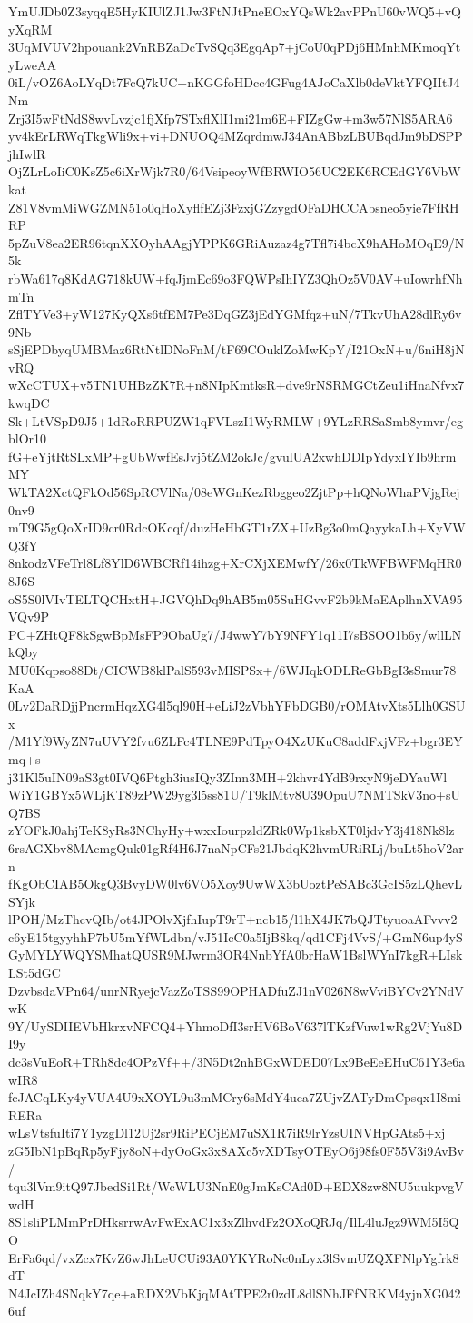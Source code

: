 YmUJDb0Z3syqqE5HyKIUlZJ1Jw3FtNJtPneEOxYQsWk2avPPnU60vWQ5+vQyXqRM
3UqMVUV2hpouank2VnRBZaDcTvSQq3EgqAp7+jCoU0qPDj6HMnhMKmoqYtyLweAA
0iL/vOZ6AoLYqDt7FcQ7kUC+nKGGfoHDcc4GFug4AJoCaXlb0deVktYFQIItJ4Nm
Zrj3I5wFtNdS8wvLvzjc1fjXfp7STxflXlI1mi21m6E+FIZgGw+m3w57NlS5ARA6
yv4kErLRWqTkgWli9x+vi+DNUOQ4MZqrdmwJ34AnABbzLBUBqdJm9bDSPPjhIwlR
OjZLrLoIiC0KsZ5c6iXrWjk7R0/64VsipeoyWfBRWIO56UC2EK6RCEdGY6VbWkat
Z81V8vmMiWGZMN51o0qHoXyflfEZj3FzxjGZzygdOFaDHCCAbsneo5yie7FfRHRP
5pZuV8ea2ER96tqnXXOyhAAgjYPPK6GRiAuzaz4g7Tfl7i4bcX9hAHoMOqE9/N5k
rbWa617q8KdAG718kUW+fqJjmEc69o3FQWPsIhIYZ3QhOz5V0AV+uIowrhfNhmTn
ZflTYVe3+yW127KyQXs6tfEM7Pe3DqGZ3jEdYGMfqz+uN/7TkvUhA28dlRy6v9Nb
sSjEPDbyqUMBMaz6RtNtlDNoFnM/tF69COuklZoMwKpY/I21OxN+u/6niH8jNvRQ
wXcCTUX+v5TN1UHBzZK7R+n8NIpKmtksR+dve9rNSRMGCtZeu1iHnaNfvx7kwqDC
Sk+LtVSpD9J5+1dRoRRPUZW1qFVLszI1WyRMLW+9YLzRRSaSmb8ymvr/egblOr10
fG+eYjtRtSLxMP+gUbWwfEsJvj5tZM2okJc/gvulUA2xwhDDIpYdyxIYIb9hrmMY
WkTA2XctQFkOd56SpRCVlNa/08eWGnKezRbggeo2ZjtPp+hQNoWhaPVjgRej0nv9
mT9G5gQoXrID9cr0RdcOKcqf/duzHeHbGT1rZX+UzBg3o0mQayykaLh+XyVWQ3fY
8nkodzVFeTrl8Lf8YlD6WBCRf14ihzg+XrCXjXEMwfY/26x0TkWFBWFMqHR08J6S
oS5S0lVIvTELTQCHxtH+JGVQhDq9hAB5m05SuHGvvF2b9kMaEAplhnXVA95VQv9P
PC+ZHtQF8kSgwBpMsFP9ObaUg7/J4wwY7bY9NFY1q11I7sBSOO1b6y/wllLNkQby
MU0Kqpso88Dt/CICWB8klPalS593vMISPSx+/6WJIqkODLReGbBgI3sSmur78KaA
0Lv2DaRDjjPncrmHqzXG4l5ql90H+eLiJ2zVbhYFbDGB0/rOMAtvXts5Llh0GSUx
/M1Yf9WyZN7uUVY2fvu6ZLFc4TLNE9PdTpyO4XzUKuC8addFxjVFz+bgr3EYmq+s
j31Kl5uIN09aS3gt0IVQ6Ptgh3iusIQy3ZInn3MH+2khvr4YdB9rxyN9jeDYauWl
WiY1GBYx5WLjKT89zPW29yg3l5ss81U/T9klMtv8U39OpuU7NMTSkV3no+sUQ7BS
zYOFkJ0ahjTeK8yRs3NChyHy+wxxIourpzldZRk0Wp1ksbXT0ljdvY3j418Nk8lz
6rsAGXbv8MAcmgQuk01gRf4H6J7naNpCFs21JbdqK2hvmURiRLj/buLt5hoV2arn
fKgObCIAB5OkgQ3BvyDW0lv6VO5Xoy9UwWX3bUoztPeSABc3GcIS5zLQhevLSYjk
lPOH/MzThcvQIb/ot4JPOlvXjfhIupT9rT+ncb15/l1hX4JK7bQJTtyuoaAFvvv2
c6yE15tgyyhhP7bU5mYfWLdbn/vJ51IcC0a5IjB8kq/qd1CFj4VvS/+GmN6up4yS
GyMYLYWQYSMhatQUSR9MJwrm3OR4NnbYfA0brHaW1BslWYnI7kgR+LIskLSt5dGC
DzvbsdaVPn64/unrNRyejcVazZoTSS99OPHADfuZJ1nV026N8wVviBYCv2YNdVwK
9Y/UySDIIEVbHkrxvNFCQ4+YhmoDfI3srHV6BoV637lTKzfVuw1wRg2VjYu8DI9y
dc3sVuEoR+TRh8dc4OPzVf++/3N5Dt2nhBGxWDED07Lx9BeEeEHuC61Y3e6awIR8
fcJACqLKy4yVUA4U9xXOYL9u3mMCry6sMdY4uca7ZUjvZATyDmCpsqx1I8miRERa
wLsVtsfuIti7Y1yzgDl12Uj2sr9RiPECjEM7uSX1R7iR9lrYzsUINVHpGAts5+xj
zG5IbN1pBqRp5yFjy8oN+dyOoGx3x8AXc5vXDTsyOTEyO6j98fs0F55V3i9AvBv/
tqu3lVm9itQ97JbedSi1Rt/WcWLU3NnE0gJmKsCAd0D+EDX8zw8NU5uukpvgVwdH
8S1sliPLMmPrDHksrrwAvFwExAC1x3xZlhvdFz2OXoQRJq/IlL4luJgz9WM5I5QO
ErFa6qd/vxZcx7KvZ6wJhLeUCUi93A0YKYRoNc0nLyx3lSvmUZQXFNlpYgfrk8dT
N4JcIZh4SNqkY7qe+aRDX2VbKjqMAtTPE2r0zdL8dlSNhJFfNRKM4yjnXG0426uf
